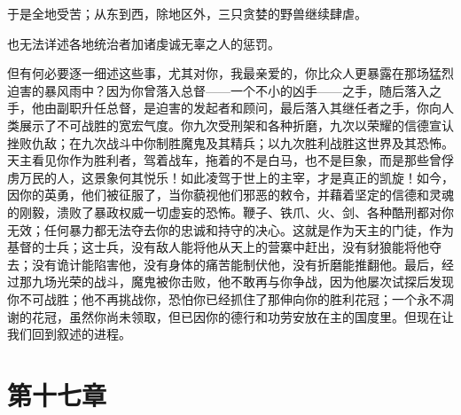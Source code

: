 于是全地受苦；从东到西，除地区外，三只贪婪的野兽继续肆虐。\par

\par

也无法详述各地统治者加诸虔诚无辜之人的惩罚。\par

但有何必要逐一细述这些事，尤其对你，我最亲爱的，你比众人更暴露在那场猛烈迫害的暴风雨中？因为你曾落入总督——一个不小的凶手——之手，随后落入之手，他由副职升任总督，是迫害的发起者和顾问，最后落入其继任者之手，你向人类展示了不可战胜的宽宏气度。你九次受刑架和各种折磨，九次以荣耀的信德宣认挫败仇敌；在九次战斗中你制胜魔鬼及其精兵；以九次胜利战胜这世界及其恐怖。天主看见你作为胜利者，驾着战车，拖着的不是白马，也不是巨象，而是那些曾俘虏万民的人，这景象何其悦乐！如此凌驾于世上的主宰，才是真正的凯旋！如今，因你的英勇，他们被征服了，当你藐视他们邪恶的敕令，并藉着坚定的信德和灵魂的刚毅，溃败了暴政权威一切虚妄的恐怖。鞭子、铁爪、火、剑、各种酷刑都对你无效；任何暴力都无法夺去你的忠诚和持守的决心。这就是作为天主的门徒，作为基督的士兵；这士兵，没有敌人能将他从天上的营寨中赶出，没有豺狼能将他夺去；没有诡计能陷害他，没有身体的痛苦能制伏他，没有折磨能推翻他。最后，经过那九场光荣的战斗，魔鬼被你击败，他不敢再与你争战，因为他屡次试探后发现你不可战胜；他不再挑战你，恐怕你已经抓住了那伸向你的胜利花冠；一个永不凋谢的花冠，虽然你尚未领取，但已因你的德行和功劳安放在主的国度里。但现在让我们回到叙述的进程。\par


\section{第十七章}

